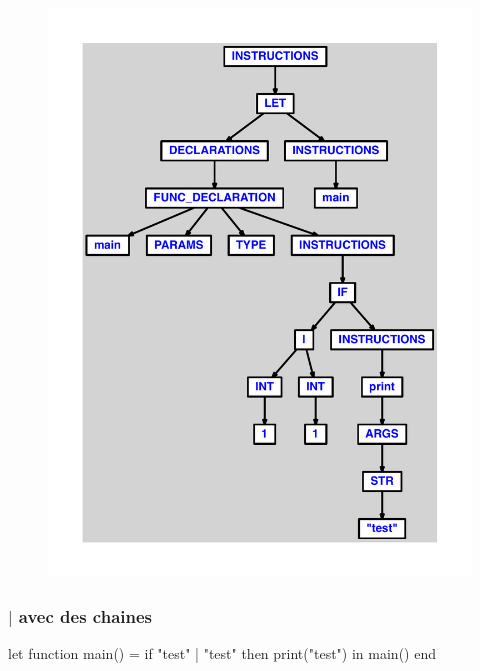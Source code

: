 \documentclass{article}
\begin{document}
\begin{figure}[H]\centering\includegraphics[max width=\textwidth]{ast/ast_277.pdf}\end{figure}\subsubsection{$ | $ avec des chaines}
\begin{verbatimtab}
let
	function main() =
		if "test" | "test" then print("test")
in main() end
\end{verbatimtab}
\end{document}
